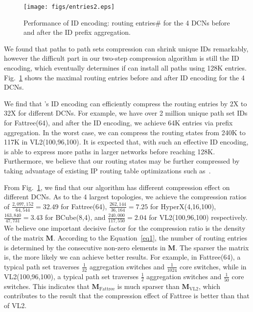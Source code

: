 \begin{figure}[t]
\hspace{-0.15in}
\texttt{[image: figs/entries2.eps]}
\caption{Performance of ID encoding: routing entries$\#$ for the 4 DCNs before and after the ID prefix aggregation.}
\label{fig:table}
\end{figure}

 We found that paths to path sets compression can shrink unique IDs remarkably, however the difficult part in our two-step compression algorithm is still the ID encoding, which eventually determines if \sys can install all paths using 128K entries. Fig.~\ref{fig:table} shows the maximal routing entries before and after ID encoding for the 4 DCNs.

We find that \sys's ID encoding can efficiently compress the routing entries by 2X to 32X for different DCNs. For example, we have over 2 million unique path set IDs for Fattree(64), and after the ID encoding, we achieve 64K entries via prefix aggregation. In the worst case, we can compress the routing states from 240K to 117K in VL2(100,96,100). It is expected that, with such an effective ID encoding, \sys is able to express more paths in larger networks before reaching 128K. Furthermore, we believe that our routing states may be further compressed by taking advantage of existing IP routing table optimizations such as~\cite{longestmatching,IPtable2013}.

From Fig.~\ref{fig:table}, we find that our algorithm has different compression effect on different DCNs. As to the 4 largest topologies, we achieve the compression ratios of $\frac{2,097,152}{64,544}=32.49$ for Fattree(64), $\frac{262,144}{36,164}= 7.25$ for HyperX(4,16,100), $\frac{163,840}{47,731}=3.43$ for BCube(8,4), and $\frac{240,000}{117,550} = 2.04$ for VL2(100,96,100) respectively. We believe one important decisive factor for the compression ratio is the density of the matrix $\mathbf{M}$. According to the Equation~\ref{eq1}, the number of routing entries is determined by the consecutive non-zero elements in $\mathbf{M}$. The sparser the matrix is, the more likely we can achieve better results. For example, in Fattree(64), a typical path set traverses $\frac{1}{32}$ aggregation switches and $\frac{1}{1024}$ core switches, while in VL2(100,96,100), a typical path set traverses $\frac{1}{2}$ aggregation switches and $\frac{1}{50}$ core switches. This indicates that $\mathbf{M}_{\text{Fattree}}$ is much sparser than $\mathbf{M}_{\text{VL2}}$, which contributes to the result that the compression effect of Fattree is better than that of VL2.


